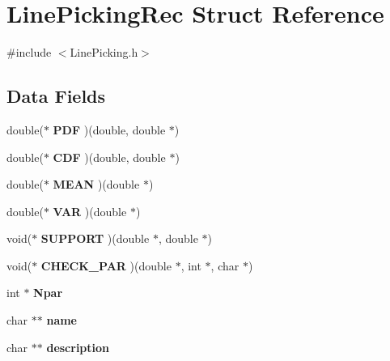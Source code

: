 \hypertarget{struct_line_picking_rec}{\section{Line\-Picking\-Rec Struct Reference}
\label{struct_line_picking_rec}
}


{\ttfamily \#include $<$Line\-Picking.\-h$>$}

\subsection*{Data Fields}
\begin{DoxyCompactItemize}
\item 
\hypertarget{struct_line_picking_rec_ae771b5624dc57ea73c6d5059f02251f5}{double($\ast$ {\bfseries P\-D\-F} )(double, double $\ast$)}\label{struct_line_picking_rec_ae771b5624dc57ea73c6d5059f02251f5}

\item 
\hypertarget{struct_line_picking_rec_a35f0d15618ffe567bcc326a076bb8c72}{double($\ast$ {\bfseries C\-D\-F} )(double, double $\ast$)}\label{struct_line_picking_rec_a35f0d15618ffe567bcc326a076bb8c72}

\item 
\hypertarget{struct_line_picking_rec_a31998c790987df0319a5cec680a2f2ae}{double($\ast$ {\bfseries M\-E\-A\-N} )(double $\ast$)}\label{struct_line_picking_rec_a31998c790987df0319a5cec680a2f2ae}

\item 
\hypertarget{struct_line_picking_rec_ad0b3c8bc8be454fcba65a153181e5dee}{double($\ast$ {\bfseries V\-A\-R} )(double $\ast$)}\label{struct_line_picking_rec_ad0b3c8bc8be454fcba65a153181e5dee}

\item 
\hypertarget{struct_line_picking_rec_a800220d7d26db4a7c3dfd083a1f1f9ab}{void($\ast$ {\bfseries S\-U\-P\-P\-O\-R\-T} )(double $\ast$, double $\ast$)}\label{struct_line_picking_rec_a800220d7d26db4a7c3dfd083a1f1f9ab}

\item 
\hypertarget{struct_line_picking_rec_a9ae62d7891ffd81baf6c300e07f70f3b}{void($\ast$ {\bfseries C\-H\-E\-C\-K\-\_\-\-P\-A\-R} )(double $\ast$, int $\ast$, char $\ast$)}\label{struct_line_picking_rec_a9ae62d7891ffd81baf6c300e07f70f3b}

\item 
\hypertarget{struct_line_picking_rec_ab21bf14c2d8c76f6b0e3ae69e8f42171}{int $\ast$ {\bfseries Npar}}\label{struct_line_picking_rec_ab21bf14c2d8c76f6b0e3ae69e8f42171}

\item 
\hypertarget{struct_line_picking_rec_a42306111ecd5284bcec721e421e36d82}{char $\ast$$\ast$ {\bfseries name}}\label{struct_line_picking_rec_a42306111ecd5284bcec721e421e36d82}

\item 
\hypertarget{struct_line_picking_rec_a3c43f557a27ff7b02bb1b20eb532c668}{char $\ast$$\ast$ {\bfseries description}}\label{struct_line_picking_rec_a3c43f557a27ff7b02bb1b20eb532c668}

\end{DoxyCompactItemize}


